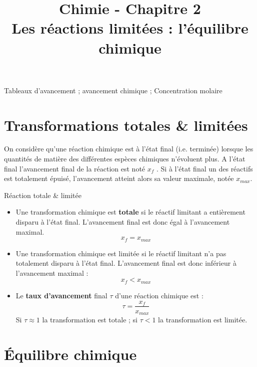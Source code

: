 \documentclass[11pt,a4paper]{article}
\title{\large Chimie - Chapitre 2 \\ \LARGE  Les réactions limitées : l'équilibre chimique \\}
\begin{document}
\maketitle
\vspace{-1cm}

\begin{tcolorbox}[title=Notions de la classe de première à rappeler]
Tableaux d'avancement ; avancement chimique ; Concentration molaire
\end{tcolorbox}
\tableofcontents

\section{Transformations totales \& limitées}

On considère qu’une réaction chimique est à l’état final (i.e. terminée) lorsque les quantités de matière des différentes espèces chimiques n’évoluent plus.  A l’état final l’avancement final de la réaction est noté $x_f$ .  Si à l’état final un des réactifs est totalement épuisé, l’avancement atteint alors sa valeur maximale, notée $x_{max}$.  

\begin{defn}{Réaction totale \& limitée}
\begin{itemize}
    \item Une transformation chimique est \textbf{totale} si le réactif limitant a entièrement disparu à l’état final.  L’avancement final est donc égal à l’avancement maximal. \[ x_f = x_{max} \]
    \item Une transformation chimique est limitée si le réactif limitant n’a pas totalement disparu à l’état final.  L’avancement final est donc inférieur à l’avancement maximal : \[ x_f < x_{max} \]
	\item Le \textbf{taux d’avancement} final $\tau$ d’une réaction chimique est : \[ \tau = \dfrac{x_f}{x_{max}} \]
	Si $ \tau \approx 1$ la transformation est totale ; si $\tau < 1$ la transformation est limitée. 
\end{itemize}
\end{defn}

\section{Équilibre chimique}
\end{document}
